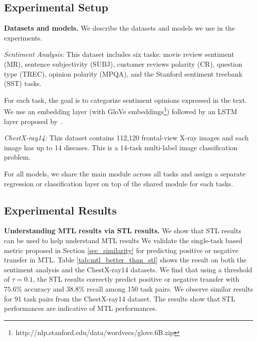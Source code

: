 \subsection{Experimental Setup}

{\bf Datasets and models.} We describe the datasets and models we use in the experiments.

{\it Sentiment Analysis:} This dataset includes six tasks: movie review sentiment (MR), sentence subjectivity (SUBJ), customer reviews polarity (CR), question type (TREC), opinion polarity (MPQA), and the Stanford sentiment treebank (SST) tasks.

{For each task, the goal is to categorize sentiment opinions expressed in the text.
We use an embedding layer (with GloVe embeddings\footnote{http://nlp.stanford.edu/data/wordvecs/glove.6B.zip}) followed by an LSTM layer proposed by~\cite{lei2018simple}.
}

{\it ChestX-ray14:} This dataset contains 112,120 frontal-view X-ray images and each image has up to 14 diseases.
This is a 14-task multi-label image classification problem.

For all models, we share the main module across all tasks and assign a separate regression or classification layer on top of the shared module for each tasks.



\subsection{Experimental Results}

\textbf{Understanding MTL results via STL results.}
We show that STL results can be used to help understand MTL results
We validate the single-task based metric proposed in Section \ref{sec_similarity} for predicting positive or negative transfer in MTL.
Table \ref{tab:mtl_better_than_stl} shows the result on both the sentiment analysis and the ChestX-ray14 datasets.
We find that using a threshold of $\tau = 0.1$, the STL results correctly predict positive or negative transfer with $75.6\%$ accuracy and $38.8\%$ recall among 150 task pairs.
We observe similar results for 91 task pairs from the ChestX-ray14 dataset.
The results show that STL performances are indicative of MTL performances.


